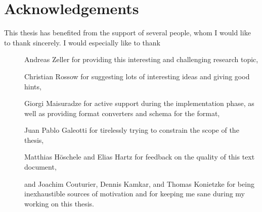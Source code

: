 \section*{Acknowledgements}
This thesis has benefited from the support of several people, whom I would like to thank sincerely.
I would especially like to thank
\begin{description}
	\item[] Andreas Zeller for providing this interesting and challenging research topic,
	\item[] Christian Rossow for suggesting lots of interesting ideas and giving good hints,
	\item[] Giorgi Maisuradze for active support during the implementation phase, as well as providing format
	converters and schema for the \png format,
	\item[] Juan Pablo Galeotti for tirelessly trying to constrain the scope of the thesis,
 	\item[] Matthias Höschele and Elias Hartz for feedback on the quality of this text document,
	\item[] and Joachim Couturier, Dennis Kamkar, and Thomas Konietzke for being inexhaustible sources
	of motivation and for keeping me sane during my working on this thesis.
\end{description}